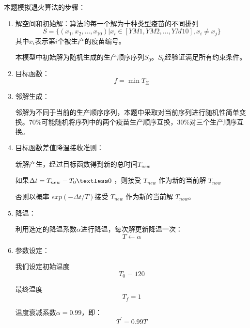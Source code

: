 \documentclass[UTF8]{ctexart}
\begin{document}
	本题模拟退火算法的步骤：
	\begin{enumerate}
		\item 解空间和初始解：算法的每一个解为十种类型疫苗的不同排列
		\begin{equation}
		S=\{(x_1,x_2,\dots,x_{10})|x_{i}\in[YM1,YM2,\dots,YM10],x_{i}\neq x_{j}\}
		\end{equation}
		其中$x_{i}$表示第$i$个被生产的疫苗编号。
						
		\qquad 本模型中初始解为随机生成的生产顺序序列$S_{0}$。$S_{0}$经验证满足所有约束条件。

		\item 目标函数：
		\begin{equation*}
		f = \min T_{\Sigma}
		\end{equation*}
		
		\item 邻解生成：
		
		\qquad 邻解为不同于当前的生产顺序序列，本题中采取对当前序列进行随机性简单变换。70\%可能随机将序列中的两个疫苗生产顺序互换，30\%对三个生产顺序互换。
		
		\item 目标函数差值降温接收准则：
		
		\qquad 新解产生，经过目标函数得到新的总时间$ T_{new} $
		
		\qquad 如果$ \Delta t = T_{new} - T_{0}  \textless 0 $ ，则接受 $   T_{new}$ 作为新的当前解 $ T_{now} $
		
		\qquad 否则以概率 $exp \left( -\Delta t/ T\right)$接受 $   T_{new}$ 作为新的当前解 $ T_{now} $。
		
		\item 降温：
		
		\qquad 利用选定的降温系数$\alpha$进行降温，每次解更新降温一次：
		\begin{equation*}
		T \gets \alpha
		\end{equation*}
				
		\item 参数设定：
		
		\qquad 我们设定初始温度
		\begin{equation*}
		T_{0} = 120
		\end{equation*}
		
		\qquad 最终温度
		\begin{equation*}
		T_{f} = 1
		\end{equation*}
		
		\qquad 温度衰减系数$ \alpha = 0.99 $，即：
		\begin{equation*}
		 T^{'} = 0.99 T
		\end{equation*}
			

\end{enumerate}
\end{document}
